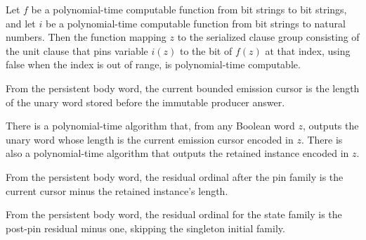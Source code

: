 \begin{lemma}
\label{Complexity.clA5Pin_native}
\leanok
{}
Let $f$ be a polynomial-time computable function from bit strings to bit strings, and
let $i$ be a polynomial-time computable function from bit strings to natural numbers.
Then the function mapping $z$ to the serialized clause group consisting of the unit
clause that pins variable $i(z)$ to the bit of $f(z)$ at that index, using false when
the index is out of range, is polynomial-time computable.
\end{lemma}

\begin{definition}
\label{Complexity.clA5Cursor}
\leanok
{}
From the persistent body word, the current bounded emission cursor is the length of the unary word stored before the immutable producer answer.
\end{definition}

\begin{lemma}
\label{Complexity.clA5Cursor_native}
\leanok
{}
There is a polynomial-time algorithm that, from any Boolean word $z$, outputs the unary
word whose length is the current emission cursor encoded in $z$. There is also a
polynomial-time algorithm that outputs the retained instance encoded in $z$.
\end{lemma}

\begin{definition}
\label{Complexity.clA5InitialIndex}
\leanok
{}
From the persistent body word, the residual ordinal after the pin family is the current cursor minus the retained instance's length.
\end{definition}

\begin{definition}
\label{Complexity.clA5StateIndex}
\leanok
{}
From the persistent body word, the residual ordinal for the state family is the post-pin residual minus one, skipping the singleton initial family.
\end{definition}

